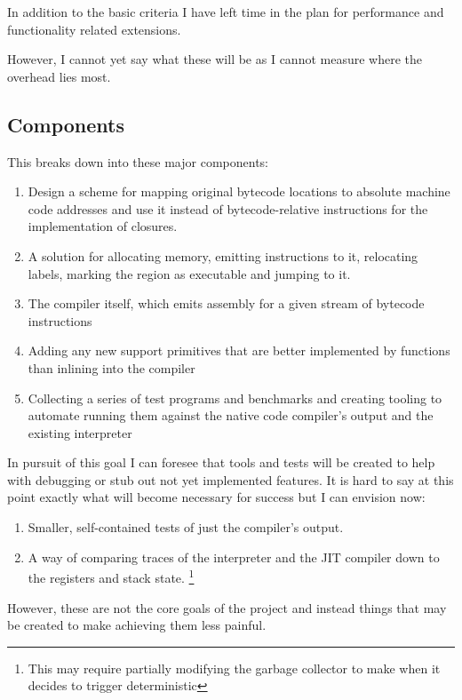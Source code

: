 \documentclass[12pt,a4paper, headings=standardclasses]{scrartcl}
\begin{document}
In addition to the basic criteria I have left time in the plan for
performance and functionality related extensions. 

However, I cannot yet say what these will be as I cannot measure where the overhead lies most.

\subsection*{Components}

This breaks down into these major components:

\begin{enumerate}
\item Design a scheme for mapping original bytecode locations to absolute
    machine code addresses and use it instead of bytecode-relative instructions
    for the implementation of closures.
\item A solution for allocating memory, emitting instructions to it,
    relocating labels, marking the region as executable and jumping to it.
\item The compiler itself, which emits assembly for a given stream of bytecode
    instructions
\item Adding any new support primitives that are better implemented by functions
    than inlining into the compiler
\item Collecting a series of test programs and benchmarks and creating
    tooling to automate running them against the native code compiler's
    output and the existing interpreter
\end{enumerate}

In pursuit of this goal I can foresee that tools and tests will be created to
help with debugging or stub out not yet implemented features. It is hard to
say at this point exactly what will become necessary for success but I can
envision now:

\begin{enumerate}
\item Smaller, self-contained tests of just the compiler's output.
\item A way of comparing traces of the interpreter and the JIT compiler down to the registers and stack state. \footnote{This may require partially modifying the garbage collector to make when it decides to trigger deterministic}
\end{enumerate}

However, these are not the core goals of the project and instead things that
may be created to make achieving them less painful.
\end{document}
